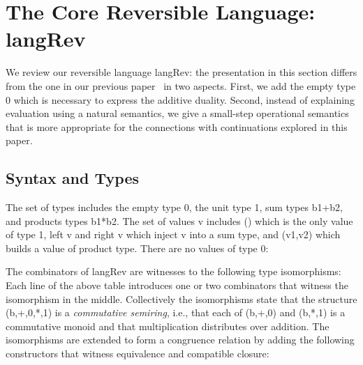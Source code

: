 \documentclass[preprint]{sigplanconf}
\begin{document}
\section{The Core Reversible Language: {{langRev}} }
\label{sec:pi}

We review our reversible language {{langRev}}: the presentation in this
section differs from the one in our previous paper~\cite{infeffects} in two
aspects. First, we add the empty type {{0}} which is necessary to express the
additive duality. Second, instead of explaining evaluation using a natural
semantics, we give a small-step operational semantics that is more
appropriate for the connections with continuations explored in this paper.

\subsection{Syntax and Types} 
\label{sec:pi-syntax}

The set of types includes the empty type {{0}}, the unit type {{1}}, sum
types {{b1+b2}}, and products types {{b1*b2}}. The set of values {{v}}
includes {{()}} which is the only value of type {{1}}, {{left v}} and {{right v}} 
which inject {{v}} into a sum type, and {{(v1,v2)}} which builds a
value of product type. There are no values of type {{0}}:

The combinators of {{langRev}} are witnesses to the following type
isomorphisms: 
Each line of the above table introduces one or two combinators that witness
the isomorphism in the middle. Collectively the isomorphisms state that the
structure {{(b,+,0,*,1)}} is a \emph{commutative semiring}, i.e., that each
of {{(b,+,0)}} and {{(b,*,1)}} is a commutative monoid and that
multiplication distributes over addition. The isomorphisms are extended to
form a congruence relation by adding the following constructors that witness
equivalence and compatible closure:
%
%
%
\end{document}
